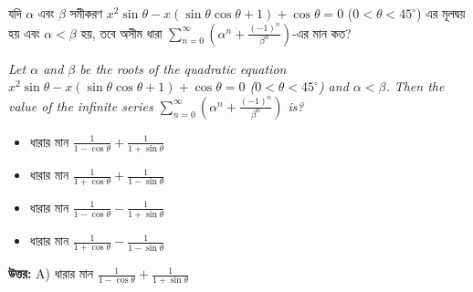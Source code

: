 \documentclass[12pt, a4paper]{article}
\begin{document}
\begin{tcolorbox}[questionbox={প্রশ্ন (Question) 27}]
    \noindent
    যদি $\alpha$ এবং $\beta$ সমীকরণ $x^2 \sin\theta - x(\sin\theta\cos\theta + 1) + \cos\theta = 0$ ($0 < \theta < 45^\circ$) এর মূলদ্বয় হয় এবং $\alpha < \beta$ হয়, তবে অসীম ধারা $\sum_{n=0}^{\infty} \left(\alpha^n + \frac{(-1)^n}{\beta^n}\right)$-এর মান কত?
    
    \vspace{0.8em}
    \begin{english}
    \noindent\textit{\color{darkgray}
    Let $\alpha$ and $\beta$ be the roots of the quadratic equation $x^2 \sin\theta - x(\sin\theta\cos\theta + 1) + \cos\theta = 0$ ($0 < \theta < 45^\circ$) and $\alpha < \beta$. Then the value of the infinite series $\sum_{n=0}^{\infty} \left(\alpha^n + \frac{(-1)^n}{\beta^n}\right)$ is?
    }
    \end{english}
\end{tcolorbox}

\begin{itemize}[label={}, leftmargin=1cm, itemsep=0.5em]
    \item[\textbf{A)}] ধারার মান $\frac{1}{1-\cos\theta} + \frac{1}{1+\sin\theta}$
    \item[\textbf{B)}] ধারার মান $\frac{1}{1+\cos\theta} + \frac{1}{1-\sin\theta}$
    \item[\textbf{C)}] ধারার মান $\frac{1}{1-\cos\theta} - \frac{1}{1+\sin\theta}$
    \item[\textbf{D)}] ধারার মান $\frac{1}{1+\cos\theta} - \frac{1}{1-\sin\theta}$
\end{itemize}

\vspace{0.5em}
\begin{tcolorbox}[answerbox]
    \textbf{\color{success} উত্তর:} A) ধারার মান $\frac{1}{1-\cos\theta} + \frac{1}{1+\sin\theta}$
\end{tcolorbox}
\vspace{1em}
\end{document}
